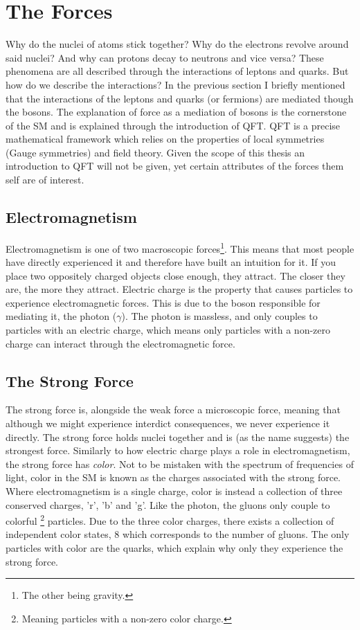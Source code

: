 \section{The Forces}
Why do the nuclei of atoms stick together? Why do the electrons revolve
around said nuclei? And why can protons decay to neutrons and vice versa? These phenomena 
are all described through the interactions of leptons and quarks. But how do we describe the 
interactions? In the previous section I briefly mentioned that the interactions of the leptons 
and quarks (or fermions) are mediated though the bosons. The explanation of force as 
a mediation of bosons is the cornerstone of the \ac{SM} and is explained through 
the introduction of \ac{QFT}. \ac{QFT} is a precise mathematical framework which relies on the 
properties of local symmetries (Gauge symmetries) and field theory. Given the scope of this thesis
an introduction to \ac{QFT} will not be given, yet certain attributes of the forces them self
are of interest. 
\subsection{Electromagnetism}
Electromagnetism is one of two macroscopic forces\footnote{The other being gravity.}.
This means that most people have directly experienced it and therefore have built an intuition for
it. If you place two oppositely charged objects close enough, they attract. The closer they are, 
the more they attract. Electric charge is the property that causes particles to 
experience electromagnetic forces. This is due to the boson responsible for mediating it, 
the photon ($\gamma$). The photon is massless, and only couples to particles with an electric charge,
which means only particles with a non-zero charge can interact through the electromagnetic force.
\subsection{The Strong Force}
The strong force is, alongside the weak force a microscopic force, meaning that although 
we might experience interdict consequences, we never experience it directly. The strong force 
holds nuclei together and is (as the name suggests) the strongest force. Similarly to how electric 
charge plays a role in electromagnetism, the strong force has \emph{color}. Not to be mistaken 
with the spectrum of frequencies of light, color in the \ac{SM} is known as the charges 
associated with the strong force. Where electromagnetism is a single charge, color is instead a collection 
of three conserved charges, 'r', 'b' and 'g'. Like the photon, the gluons only couple to colorful
\footnote{Meaning particles with a non-zero color charge.} particles. Due to the three color charges,
there exists a collection of independent color states, 8 which corresponds to the number of gluons.
The only particles with color are the quarks, which explain why only they experience the strong force. 
